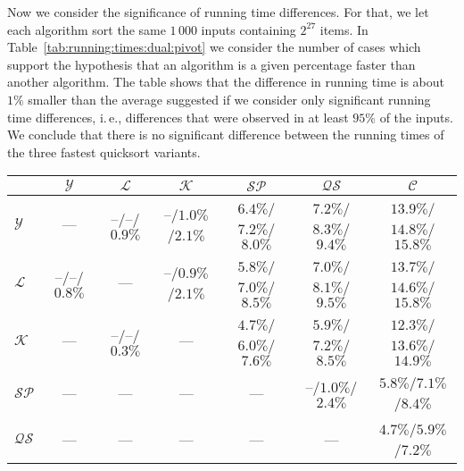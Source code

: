 \documentclass[prodmode,acmtalg]{acmsmall}
\begin{document}
Now we consider the significance of running time differences. For that, we let each algorithm sort
the same $1\,000$ inputs containing $2^{27}$ items. In Table~\ref{tab:running:times:dual:pivot} we consider 
the number of cases which support the hypothesis that an algorithm is a given percentage faster than another algorithm.
The table shows that the difference in running time is about $1\%$ smaller than the average suggested
if we consider only significant running time differences, i.\,e., differences that were observed in at least 
$95\%$ of the inputs. We conclude that there is  no 
significant difference between the running times of the three fastest quicksort variants.

\begin{table}[th]
    {
    \begin{tabular}{l||c|c|c|c|c|c}
        & $\mathcal{Y}$ & $\mathcal{L}$ & $\mathcal{K}$ & $\mathcal{SP}$ & $\mathcal{QS}$ & $\mathcal{C}$ \\ \hline 
        $\mathcal{Y}$ & --- & --/--/$0.9\%$ & --/$1.0\%$/$2.1\%$ & $6.4\%$/$7.2\%$/$8.0\%$ & $7.2\%$/$8.3\%$/$9.4\%$ & $13.9\%$/$14.8\%$/$15.8\%$  \\ \hline
        $\mathcal{L}$ & --/--/$0.8\%$ & --- & --/$0.9\%$/$2.1\%$ & $5.8\%$/$7.0\%$/$8.5\%$ & $7.0\%$/$8.1\%$/$9.5\%$ & $13.7\%$/$14.6\%$/$15.8\%$ \\ \hline
        $\mathcal{K}$ &--- & --/--/$0.3\%$ & --- & $4.7\%$/$6.0\%$/$7.6\%$ & $5.9\%$/$7.2\%$/$8.5\%$ & $12.3\%$/$13.6\%$/$14.9\%$ \\ \hline
        $\mathcal{SP} $ & --- & --- & --- & --- & --/$1.0\%$/$2.4\%$ & $5.8\%$/$7.1\%$/$8.4\%$ \\ \hline
        $\mathcal{QS} $ & --- & --- & --- & --- & --- & $4.7\%$/$5.9\%$/$7.2\%$ \\ \hline
    \end{tabular}
}
\end{table}
\end{document}
